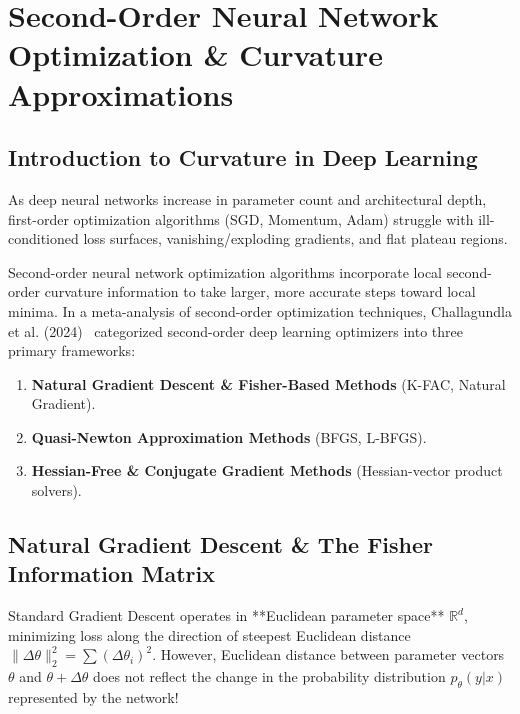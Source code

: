 \chapter{Second-Order Neural Network Optimization \& Curvature Approximations}
\label{ch:second_order_nn}

\section{Introduction to Curvature in Deep Learning}
As deep neural networks increase in parameter count and architectural depth, first-order optimization algorithms (SGD, Momentum, Adam) struggle with ill-conditioned loss surfaces, vanishing/exploding gradients, and flat plateau regions. 

Second-order neural network optimization algorithms incorporate local second-order curvature information to take larger, more accurate steps toward local minima. In a meta-analysis of second-order optimization techniques, Challagundla et al. (2024)~\cite{challagundla2024second} categorized second-order deep learning optimizers into three primary frameworks:
\begin{enumerate}[leftmargin=*]
    \item \textbf{Natural Gradient Descent \& Fisher-Based Methods} (K-FAC, Natural Gradient).
    \item \textbf{Quasi-Newton Approximation Methods} (BFGS, L-BFGS).
    \item \textbf{Hessian-Free \& Conjugate Gradient Methods} (Hessian-vector product solvers).
\end{enumerate}

\section{Natural Gradient Descent \& The Fisher Information Matrix}
Standard Gradient Descent operates in **Euclidean parameter space** $\mathbb{R}^d$, minimizing loss along the direction of steepest Euclidean distance $\|\Delta \theta\|_2^2 = \sum (\Delta \theta_i)^2$. However, Euclidean distance between parameter vectors $\theta$ and $\theta + \Delta \theta$ does not reflect the change in the probability distribution $p_\theta(y|x)$ represented by the network!

